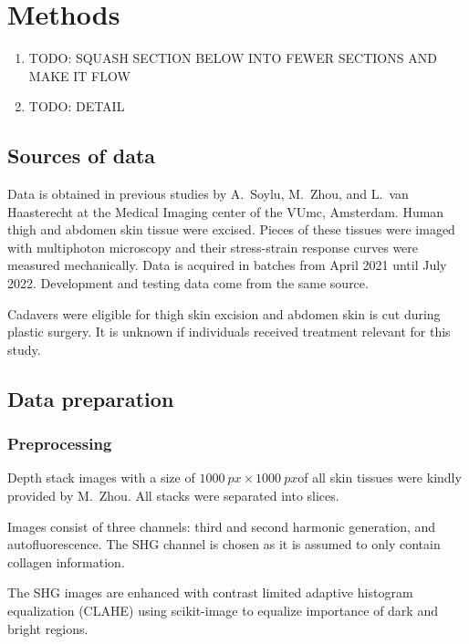\section{Methods}
\begin{enumerate}
    \item TODO: SQUASH SECTION BELOW INTO FEWER SECTIONS AND MAKE IT FLOW
    \item TODO: DETAIL
\end{enumerate}

\subsection{Sources of data}

Data is obtained in previous studies by A.\ Soylu, M.\ Zhou, and L.\ van Haasterecht at the Medical Imaging center of the VUmc, Amsterdam.
Human thigh and abdomen skin tissue were excised.
Pieces of these tissues were imaged with multiphoton microscopy and their stress-strain response curves were measured mechanically.
Data is acquired in batches from April 2021 until July 2022.
Development and testing data come from the same source.

Cadavers were eligible for thigh skin excision and abdomen skin is cut during plastic surgery.
It is unknown if individuals received treatment relevant for this study.


\subsection{Data preparation}\label{sec:skin_data_prep}

\subsubsection{Preprocessing}

Depth stack images with a size of $\qty{1000}{px}\times\qty{1000}{px}$of all skin tissues were kindly provided by M.\ Zhou.
All stacks were separated into slices.

Images consist of three channels: third and second harmonic generation, and autofluorescence.
The SHG channel is chosen as it is assumed to only contain collagen information.

The SHG images are enhanced with contrast limited adaptive histogram equalization (CLAHE) \cite{Zuiderveld1994ContrastLA} using scikit-image \cite{scikit-image} to equalize importance of dark and bright regions.

